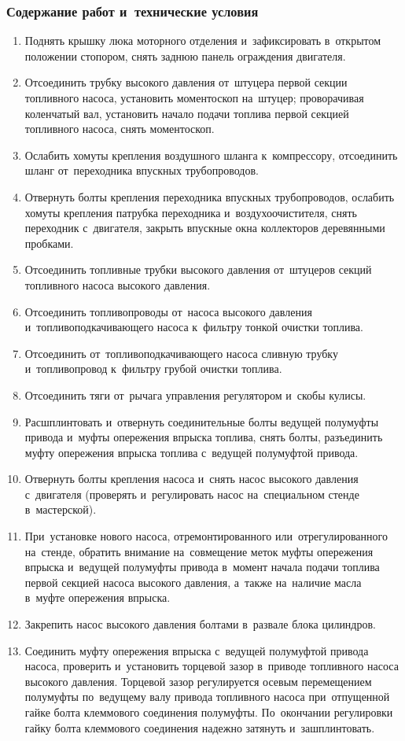 \subsubsection{Содержание работ и~технические условия}
\begin{enumerate}
    \item Поднять крышку люка моторного отделения и~зафиксировать в~открытом положении стопором, снять заднюю панель ограждения двигателя. 
    \item Отсоединить трубку высокого давления от~штуцера первой секции топливного насоса, установить моментоскоп на~штуцер; проворачивая коленчатый вал, установить начало подачи топлива первой секцией топливного насоса, снять моментоскоп. 
    \item Ослабить хомуты крепления воздушного шланга к~компрессору, отсоединить шланг от~переходника впускных трубопроводов. 
    \item Отвернуть болты крепления переходника впускных трубопроводов, ослабить хомуты крепления патрубка переходника и~воздухоочистителя, снять переходник с~двигателя, закрыть впускные окна коллекторов деревянными пробками. 
    \item Отсоединить топливные трубки высокого давления от~штуцеров секций топливного насоса высокого давления. 
    \item Отсоединить топливопроводы от~насоса высокого давления и~топливоподкачивающего насоса к~фильтру тонкой очистки топлива. 
    \item Отсоединить от~топливоподкачивающего насоса сливную трубку и~топливопровод к~фильтру грубой очистки топлива. 
    \item Отсоединить тяги от~рычага управления регулятором и~скобы кулисы. 
    \item Расшплинтовать и~отвернуть соединительные болты ведущей полумуфты привода и~муфты опережения впрыска топлива, снять болты, разъединить муфту опережения впрыска топлива с~ведущей полумуфтой привода. 
    \item Отвернуть болты крепления насоса и~снять насос высокого давления с~двигателя (проверять и~регулировать насос на~специальном стенде в~мастерской). 
    \item При~установке нового насоса, отремонтированного или~отрегулированного на~стенде, обратить внимание на~совмещение меток муфты опережения впрыска и~ведущей полумуфты привода в~момент начала подачи топлива первой секцией насоса высокого давления, а~также на~наличие масла в~муфте опережения впрыска. 
    \item Закрепить насос высокого давления болтами в~развале блока цилиндров. 
    \item Соединить муфту опережения впрыска с~ведущей полумуфтой привода насоса, проверить и~установить торцевой зазор в~приводе топливного насоса высокого давления. Торцевой зазор регулируется осевым перемещением полумуфты по~ведущему валу привода топливного насоса при~отпущенной гайке болта клеммового соединения полумуфты. По~окончании регулировки гайку болта клеммового соединения надежно затянуть и~зашплинтовать. 
        

\end{enumerate}
